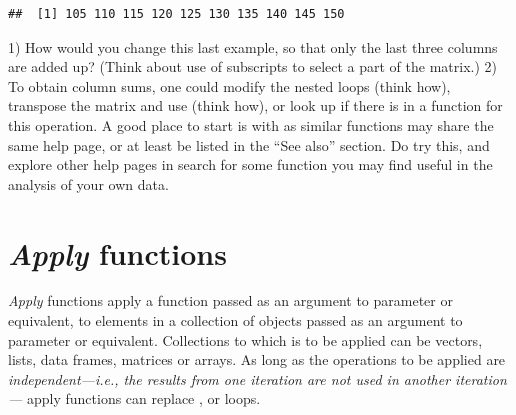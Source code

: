\documentclass[krantz2]{krantz}\usepackage{knitr}
\begin{document}
\begin{explainbox}
\begin{knitrout}\footnotesize
{}\color{fgcolor}\begin{kframe}
\begin{alltt}
\end{alltt}
\begin{verbatim}
##  [1] 105 110 115 120 125 130 135 140 145 150
\end{verbatim}
\end{kframe}
\end{knitrout}

\end{explainbox}

\begin{playground}
1) How would you change this last example, so that only the last three columns are added up? (Think about use of subscripts to select a part of the matrix.)
2) To obtain column sums, one could modify the nested loops (think how), transpose the matrix and use  (think how), or look up if there is in \Rlang a function for this operation. A good place to start is with  as similar functions may share the same help page, or at least be listed in the ``See also'' section. Do try this, and explore other help pages in search for some function you may find useful in the analysis of your own data.
\end{playground}

\section[Apply functions]{\emph{Apply} functions}\label{sec:data:apply}

\emph{Apply} functions apply a function passed as an argument to parameter  or equivalent, to elements in a collection of \Rlang objects passed as an argument to parameter  or equivalent. Collections to which  is to be applied can be vectors, lists, data frames, matrices or arrays. As long as the operations to be applied are \emph{independent---i.e., the results from one iteration are not used in another iteration---} apply functions can replace ,  or  loops.
\end{document}
